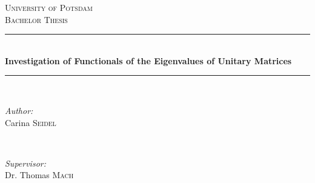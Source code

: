 \begin{titlepage}

    \newcommand{\HRule}{\rule{\linewidth}{0.5mm}} %
    
    \center
     
    
    \textsc{\LARGE University of Potsdam}\\[1.5cm] %
    \textsc{\Large Bachelor Thesis}\\[0.5cm] %
    
    
    \HRule \\[0.4cm]
    { \huge \bfseries Investigation of Functionals of the Eigenvalues of Unitary Matrices}\\[0.4cm] %
    \HRule \\[1.5cm]
     
    
    \begin{minipage}{0.4\textwidth}
    \begin{flushleft} \large
    \emph{Author:}\\
    Carina \textsc{Seidel} %
    \end{flushleft}
    \end{minipage}
    ~
    \begin{minipage}{0.4\textwidth}
    \begin{flushright} \large
    \emph{Supervisor:} \\
    Dr. Thomas \textsc{Mach} %
    \end{flushright}
    \end{minipage}\\[2cm]
    
    

\end{titlepage}
